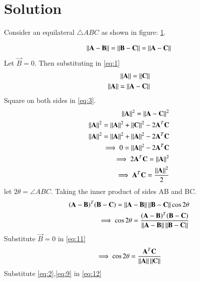 \documentclass[journal,12pt,twocolumn]{IEEEtran}
\begin{document}
\section{\textbf{Solution}}
Consider an equilateral $\triangle{ABC}$ as shown in figure: \ref{fig:es17btech11002_fig1}.
\renewcommand{\thefigure}{1}
\renewcommand{\thefigure}{\theenumi.\arabic{figure}}
\begin{figure}[!ht]
	\begin{center}
		\resizebox{\columnwidth}{!}{}
	\end{center}
\caption{}
\label{fig:es17btech11002_fig1}
\end{figure}
%
\begin{align}
    \label{eq:1}\left\lVert\mathbf{A-B}\right\rVert=\left\lVert\mathbf{B-C}\right\rVert=\left\lVert\mathbf{A-C}\right\rVert
\end{align}
Let $\vec{B}=0$. Then substituting in \eqref{eq:1}
\begin{align}
    \label{eq:2}\left\lVert\mathbf{A}\right\rVert=\left\lVert\mathbf{C}\right\rVert\\
    \label{eq:3}\left\lVert\mathbf{A}\right\rVert=\left\lVert\mathbf{A-C}\right\rVert
\end{align}
Square on both sides in \eqref{eq:3}.
\begin{align}
    \left\lVert\mathbf{A}\right\rVert^2=\left\lVert\mathbf{A-C}\right\rVert^2\\
    \left\lVert\mathbf{A}\right\rVert^2=\left\lVert\mathbf{A}\right\rVert^2+\left\lVert\mathbf{C}\right\rVert^2-2\mathbf{A}^T\mathbf{C}\\
    \left\lVert\mathbf{A}\right\rVert^2=\left\lVert\mathbf{A}\right\rVert^2+\left\lVert\mathbf{A}\right\rVert^2-2\mathbf{A}^T\mathbf{C}\\
    \implies0=\left\lVert\mathbf{A}\right\rVert^2-2\mathbf{A}^T\mathbf{C}\\
    \implies2\mathbf{A}^T\mathbf{C}=\left\lVert\mathbf{A}\right\rVert^2\\
    \label{eq:9}\implies\mathbf{A}^T\mathbf{C}=\frac{\left\lVert\mathbf{A}\right\rVert^2}{2}
\end{align}
let $2\theta=\angle ABC$.
Taking the inner product of sides AB and BC.
\begin{align}
    (\mathbf{A}-\mathbf{B})^T(\mathbf{B}-\mathbf{C}) =
    \left\lVert\mathbf{A}-\mathbf{B}\right\rVert\left\lVert\mathbf{B}-\mathbf{C}\right\rVert\cos{2\theta}\\
    \label{eq:11}\implies \cos{2\theta}=\frac{(\mathbf{A}-\mathbf{B})^T(\mathbf{B}-\mathbf{C})}{\left\lVert\mathbf{A}-\mathbf{B}\right\rVert\left\lVert\mathbf{B}-\mathbf{C}\right\rVert}
\end{align}
Substitute $\vec{B}=0$ in \eqref{eq:11}
\begin{align}
    \label{eq:12}\implies\cos{2\theta}=\frac{\mathbf{A}^T\mathbf{C}}{\left\lVert\mathbf{A}\right\rVert\left\lVert\mathbf{C}\right\rVert}
\end{align}
Substitute \eqref{eq:2},\eqref{eq:9} in \eqref{eq:12}
\end{document}
